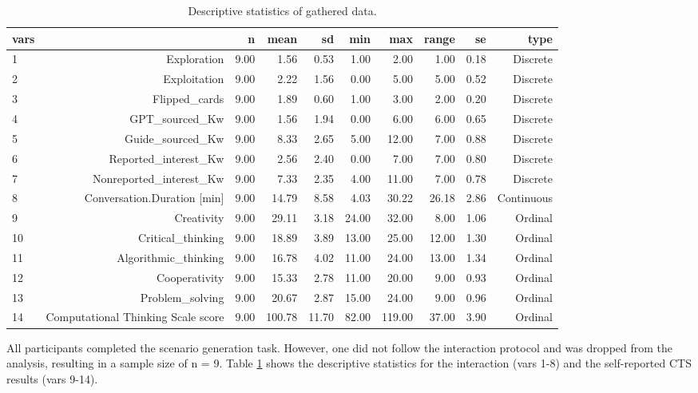 \documentclass[sn-mathphys, Numbered]{sn-jnl}%
\theoremstyle{thmstyleone}%
\theoremstyle{thmstyletwo}%
\theoremstyle{thmstylethree}%
\begin{document}
\begin{table}[ht] \caption{Descriptive statistics of gathered data.}
\centering
\begin{tabular}{lrrrrrrrrr}
  \hline
  vars & & n & mean & sd & min & max & range & se & type \\
  \hline
   1&Exploration & 9.00 & 1.56 & 0.53 & 1.00 & 2.00 & 1.00 & 0.18 & Discrete \\
   2&Exploitation & 9.00 & 2.22 & 1.56 & 0.00 & 5.00 & 5.00 & 0.52 & Discrete \\
   3&Flipped\_cards & 9.00 & 1.89& 0.60 & 1.00& 3.00& 2.00 & 0.20 & Discrete \\
   4&GPT\_sourced\_Kw & 9.00 & 1.56 & 1.94 & 0.00 & 6.00 & 6.00 & 0.65 & Discrete \\
   5&Guide\_sourced\_Kw & 9.00 & 8.33 & 2.65 & 5.00 & 12.00 & 7.00 & 0.88 & Discrete \\
   6&Reported\_interest\_Kw & 9.00 & 2.56 & 2.40 & 0.00 & 7.00 & 7.00 & 0.80 & Discrete \\
   7&Nonreported\_interest\_Kw & 9.00 & 7.33 & 2.35 & 4.00 & 11.00 & 7.00 & 0.78 & Discrete \\
   8&Conversation.Duration [min] & 9.00 & 14.79 & 8.58 & 4.03 & 30.22 & 26.18 & 2.86 & Continuous \\
   9&Creativity & 9.00 & 29.11 & 3.18 & 24.00 & 32.00 & 8.00 & 1.06 & Ordinal \\
   10&Critical\_thinking & 9.00 & 18.89 & 3.89 & 13.00 & 25.00 & 12.00 & 1.30 & Ordinal \\
   11&Algorithmic\_thinking & 9.00 & 16.78 & 4.02 & 11.00 & 24.00 & 13.00 & 1.34 & Ordinal \\
   12&Cooperativity & 9.00 & 15.33 & 2.78 & 11.00 & 20.00 & 9.00 & 0.93 & Ordinal \\
   13&Problem\_solving & 9.00 & 20.67 & 2.87 & 15.00 & 24.00 & 9.00 & 0.96 & Ordinal \\
   14&Computational Thinking Scale score & 9.00 & 100.78 & 11.70 & 82.00 & 119.00 & 37.00 & 3.90 & Ordinal \\
   \hline
\end{tabular}
\label{summary}
\end{table}

All participants completed the scenario generation task. However, one did not follow the interaction protocol and was dropped from the analysis, resulting in a sample size of n = 9. Table \ref{summary} shows the descriptive statistics for the interaction (vars 1-8) and the self-reported CTS results (vars 9-14). 
\end{document}
